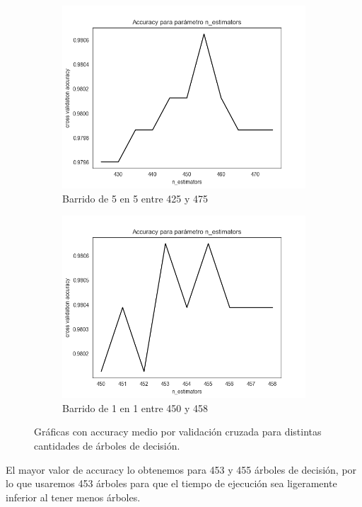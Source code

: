 \documentclass[11pt,a4paper]{article}
\theoremstyle{definition}
\begin{document}
\begin{figure}[H]
\begin{subfigure}{.45\textwidth}
 		\includegraphics[width=1\textwidth]{images/n_est3}
 		\caption{Barrido de 5 en 5 entre 425 y 475}
  		\label{fig:sub3}
		\end{subfigure}
		\begin{subfigure}{.45\textwidth}
  		\centering
  		\includegraphics[width=1\textwidth]{images/n_est4}
  		\caption{Barrido de 1 en 1 entre 450 y 458}
  		\label{fig:sub4}
		\end{subfigure}
		\caption{Gráficas con accuracy medio por validación cruzada para distintas cantidades de árboles de decisión.}
		\label{fig:test}
	\end{figure}
		
		El mayor valor de accuracy lo obtenemos para 453 y 455 árboles de decisión, por lo que usaremos 453 árboles para que el tiempo de ejecución sea ligeramente inferior al tener menos árboles.
		
\end{document}
